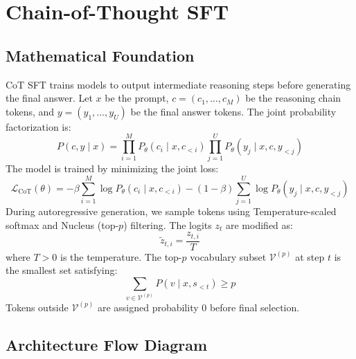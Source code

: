 \documentclass{article}
\begin{document}
\newpage
\section{Chain-of-Thought SFT}

\subsection{Mathematical Foundation}
CoT SFT trains models to output intermediate reasoning steps before generating the final answer. Let $x$ be the prompt, $c = (c_1, \dots, c_M)$ be the reasoning chain tokens, and $y = (y_1, \dots, y_U)$ be the final answer tokens. The joint probability factorization is:
\begin{equation}
  P(c, y \mid x) = \prod_{i=1}^M P_\theta(c_i \mid x, c_{<i}) \prod_{j=1}^U P_\theta(y_j \mid x, c, y_{<j})
\end{equation}
The model is trained by minimizing the joint loss:
\begin{equation}
  \mathcal{L}_{\text{CoT}}(\theta) = -\beta \sum_{i=1}^M \log P_\theta(c_i \mid x, c_{<i}) - (1 - \beta) \sum_{j=1}^U \log P_\theta(y_j \mid x, c, y_{<j})
\end{equation}
During autoregressive generation, we sample tokens using Temperature-scaled softmax and Nucleus (top-$p$) filtering. The logits $z_t$ are modified as:
\begin{equation}
  \tilde{z}_{t,i} = \frac{z_{t,i}}{T}
\end{equation}
where $T > 0$ is the temperature. The top-$p$ vocabulary subset $\mathcal{V}^{(p)}$ at step $t$ is the smallest set satisfying:
\begin{equation}
  \sum_{v \in \mathcal{V}^{(p)}} P(v \mid x, s_{<t}) \ge p
\end{equation}
Tokens outside $\mathcal{V}^{(p)}$ are assigned probability 0 before final selection.

\subsection{Architecture Flow Diagram}
\end{document}
